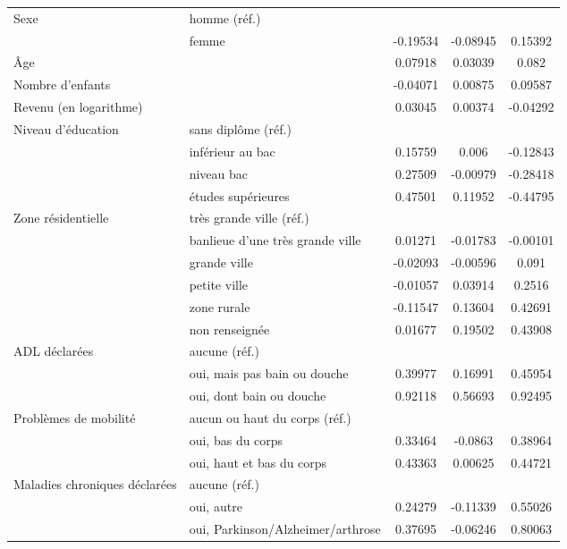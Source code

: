 \begin{Article}
\begin{refsection}[Bonnal]
\begin{table}
{\begin{tabular}{l@{\;}l@{\;} S!{\qquad}S!{\qquad}S!{\qquad}}
	Sexe  & homme (réf.)  &\sym{}&  \sym{}&\sym{} \\
	& femme & -0.19534\sym{***} & -0.08945 & 0.15392 \\\hline
	\^Age& & 0.07918\sym{***} & 0.03039\sym{***} & 0.082\sym{***} \\\hline
	Nombre d'enfants  & & -0.04071\sym{**} & 0.00875 & 0.09587\sym{***} \\\hline
	Revenu (en logarithme) & & 0.03045 & 0.00374 & -0.04292 \\\hline
	Niveau d'éducation& sans diplôme (réf.) &\sym{}&  \sym{}&\sym{} \\
	& inférieur au bac & 0.15759 & 0.006 & -0.12843 \\
	& niveau bac & 0.27509\sym{**} & -0.00979 & -0.28418 \\
	& études supérieures & 0.47501\sym{***} & 0.11952 & -0.44795\sym{**} \\\hline
	Zone résidentielle& très grande ville (réf.)  &\sym{}&  \sym{}&\sym{} \\
	& banlieue d'une très grande ville & 0.01271 & -0.01783 & -0.00101 \\
	& grande ville & -0.02093 & -0.00596 & 0.091 \\
	& petite ville & -0.01057 & 0.03914 & 0.2516\sym{*} \\
	& zone rurale & -0.11547 & 0.13604 & 0.42691\sym{***} \\
	& non renseignée & 0.01677 & 0.19502 & 0.43908\sym{**} \\\hline
	ADL déclarées& aucune (réf.) &\sym{}&  \sym{}&\sym{} \\
	& oui, mais pas bain ou douche & 0.39977\sym{***} & 0.16991 & 0.45954\sym{***} \\
	& oui, dont bain ou douche & 0.92118\sym{***} & 0.56693\sym{***} & 0.92495\sym{***} \\\hline
	Problèmes de mobilité& aucun ou haut du corps (réf.)&\sym{}&  \sym{}&\sym{} \\
	& oui, bas du corps & 0.33464\sym{***} & -0.0863 & 0.38964\sym{***} \\
	& oui, haut et bas du corps & 0.43363\sym{***} & 0.00625 & 0.44721\sym{***} \\\hline
	Maladies chroniques déclarées & aucune (réf.) &\sym{}&  \sym{}&\sym{} \\
	& oui, autre & 0.24279\sym{**} & -0.11339 & 0.55026\sym{***} \\
	& oui, Parkinson/Alzheimer/arthrose & 0.37695\sym{***} & -0.06246 & 0.80063\sym{***} \\\hline

\end{tabular}}
\end{table}
\end{refsection}
\end{Article}
